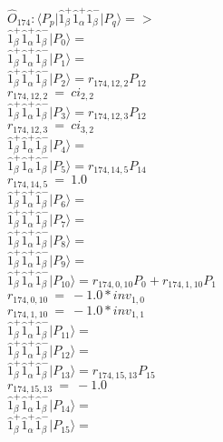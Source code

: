 \documentclass[14pt]{article}
\begin{document}
    $\hat{O}_{174}:  \langle{P_p}\vert \hat{1}_{\beta}^{+}\hat{1}_{\alpha}^{+}\hat{1}_{\beta}^{-} \vert{P_q}\rangle => $ \\ 
    $ \hat{1}_{\beta}^{+}\hat{1}_{\alpha}^{+}\hat{1}_{\beta}^{-} \vert{P_{0}}\rangle =  $ \\ 
    $ \hat{1}_{\beta}^{+}\hat{1}_{\alpha}^{+}\hat{1}_{\beta}^{-} \vert{P_{1}}\rangle =  $ \\ 
    $ \hat{1}_{\beta}^{+}\hat{1}_{\alpha}^{+}\hat{1}_{\beta}^{-} \vert{P_{2}}\rangle = {r}_{174,12,2}P_{12} $ \\ 
    ${r}_{174,12,2}\ =\ {ci}_{2,2} $ \\ 
    $ \hat{1}_{\beta}^{+}\hat{1}_{\alpha}^{+}\hat{1}_{\beta}^{-} \vert{P_{3}}\rangle = {r}_{174,12,3}P_{12} $ \\ 
    ${r}_{174,12,3}\ =\ {ci}_{3,2} $ \\ 
    $ \hat{1}_{\beta}^{+}\hat{1}_{\alpha}^{+}\hat{1}_{\beta}^{-} \vert{P_{4}}\rangle =  $ \\ 
    $ \hat{1}_{\beta}^{+}\hat{1}_{\alpha}^{+}\hat{1}_{\beta}^{-} \vert{P_{5}}\rangle = {r}_{174,14,5}P_{14} $ \\ 
    ${r}_{174,14,5}\ =\ 1.0 $ \\ 
    $ \hat{1}_{\beta}^{+}\hat{1}_{\alpha}^{+}\hat{1}_{\beta}^{-} \vert{P_{6}}\rangle =  $ \\ 
    $ \hat{1}_{\beta}^{+}\hat{1}_{\alpha}^{+}\hat{1}_{\beta}^{-} \vert{P_{7}}\rangle =  $ \\ 
    $ \hat{1}_{\beta}^{+}\hat{1}_{\alpha}^{+}\hat{1}_{\beta}^{-} \vert{P_{8}}\rangle =  $ \\ 
    $ \hat{1}_{\beta}^{+}\hat{1}_{\alpha}^{+}\hat{1}_{\beta}^{-} \vert{P_{9}}\rangle =  $ \\ 
    $ \hat{1}_{\beta}^{+}\hat{1}_{\alpha}^{+}\hat{1}_{\beta}^{-} \vert{P_{10}}\rangle = {r}_{174,0,10}P_{0}+{r}_{174,1,10}P_{1} $ \\ 
    ${r}_{174,0,10}\ =\ -1.0*{inv}_{1,0} $ \\ 
    ${r}_{174,1,10}\ =\ -1.0*{inv}_{1,1} $ \\ 
    $ \hat{1}_{\beta}^{+}\hat{1}_{\alpha}^{+}\hat{1}_{\beta}^{-} \vert{P_{11}}\rangle =  $ \\ 
    $ \hat{1}_{\beta}^{+}\hat{1}_{\alpha}^{+}\hat{1}_{\beta}^{-} \vert{P_{12}}\rangle =  $ \\ 
    $ \hat{1}_{\beta}^{+}\hat{1}_{\alpha}^{+}\hat{1}_{\beta}^{-} \vert{P_{13}}\rangle = {r}_{174,15,13}P_{15} $ \\ 
    ${r}_{174,15,13}\ =\ -1.0 $ \\ 
    $ \hat{1}_{\beta}^{+}\hat{1}_{\alpha}^{+}\hat{1}_{\beta}^{-} \vert{P_{14}}\rangle =  $ \\ 
    $ \hat{1}_{\beta}^{+}\hat{1}_{\alpha}^{+}\hat{1}_{\beta}^{-} \vert{P_{15}}\rangle =  $ \\ 
    
\end{document}
